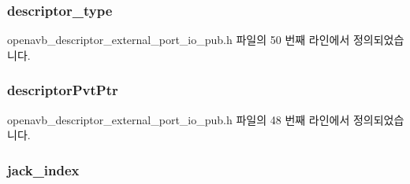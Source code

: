 \subsubsection[{\texorpdfstring{descriptor\+\_\+type}{descriptor_type}}]{ descriptor\+\_\+type}\hypertarget{structopenavb__aem__descriptor__external__port__io__t_a1e231d7874aada5925b29affc76782cc}{}\label{structopenavb__aem__descriptor__external__port__io__t_a1e231d7874aada5925b29affc76782cc}


openavb\+\_\+descriptor\+\_\+external\+\_\+port\+\_\+io\+\_\+pub.\+h 파일의 50 번째 라인에서 정의되었습니다.

\subsubsection[{\texorpdfstring{descriptor\+Pvt\+Ptr}{descriptorPvtPtr}}]{ descriptor\+Pvt\+Ptr}\hypertarget{structopenavb__aem__descriptor__external__port__io__t_a302e92fd6cf4d398d5305395359fb157}{}\label{structopenavb__aem__descriptor__external__port__io__t_a302e92fd6cf4d398d5305395359fb157}


openavb\+\_\+descriptor\+\_\+external\+\_\+port\+\_\+io\+\_\+pub.\+h 파일의 48 번째 라인에서 정의되었습니다.

\subsubsection[{\texorpdfstring{jack\+\_\+index}{jack_index}}]{ jack\+\_\+index}\hypertarget{structopenavb__aem__descriptor__external__port__io__t_a3c2192fc427391c13d48a30c641746b7}{}\label{structopenavb__aem__descriptor__external__port__io__t_a3c2192fc427391c13d48a30c641746b7}


